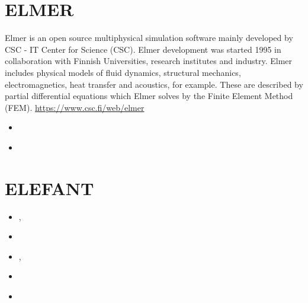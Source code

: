 
\section{ELMER} 
Elmer is an open source multiphysical simulation software mainly developed by 
CSC - IT Center for Science (CSC). Elmer development was started 1995 
in collaboration with Finnish Universities, research institutes and industry. 
Elmer includes physical models of 
fluid dynamics, structural mechanics, electromagnetics, heat transfer and acoustics, 
for example. These are described by partial differential equations which Elmer solves 
by the Finite Element Method (FEM). \url{https://www.csc.fi/web/elmer}

\begin{small}
\begin{itemize}
\item[2012] \cite{maierova}
\item[2014] \cite{mals14}
\end{itemize}
\end{small}


\section{ELEFANT}

\begin{small}
\begin{itemize}
\item[\twothousandfifteen]   \textcite{tosn15},  \textcite{matv15}
\item[\twothousandsixteen]   \textcite{busa16}
\item[\twothousandseventeen] \textcite{thie17},  \textcite{latb17}
\item[\twothousandeighteen]  \textcite{pltv18}
\item[\twothousandnineteen]  \textcite{frtv19}
\end{itemize}
\end{small}

